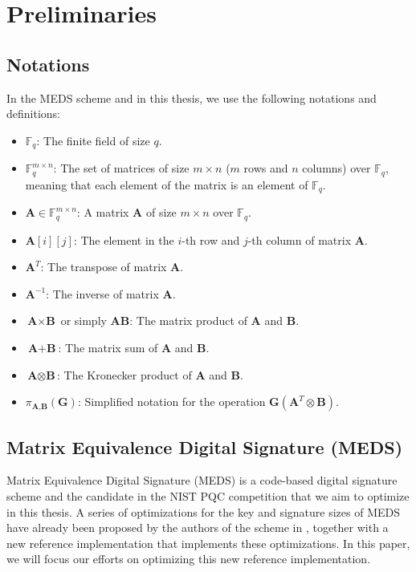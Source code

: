 \documentclass[11pt,a4paper]{report}
\theoremstyle{definition}
\begin{document}
\chapter{Preliminaries}
\label{ch:preliminaries}

\section{Notations}
\label{sec:notations}
In the MEDS scheme and in this thesis, we use the following notations and definitions:
\begin{itemize}
  \item $\mathbb{F}_q$: The finite field of size $q$.
  \item $\mathbb{F}_q^{m \times n}$: The set of matrices of size $m \times n$ ($m$ rows and $n$ columns) over $\mathbb{F}_q$, meaning that each element of the matrix is an element of $\mathbb{F}_q$.
  \item $\textbf{A} \in \mathbb{F}_q^{m \times n}$: A matrix $\textbf{A}$ of size $m \times n$ over $\mathbb{F}_q$.
  \item $\textbf{A}[i][j]$: The element in the $i$-th row and $j$-th column of matrix $\textbf{A}$.
  \item $\textbf{A}^T$: The transpose of matrix $\textbf{A}$.
  \item $\textbf{A}^{-1}$: The inverse of matrix $\textbf{A}$.
  \item $\textbf{A} \times \textbf{B}$ or simply $\textbf{AB}$: The matrix product of $\textbf{A}$ and $\textbf{B}$.
  \item $\textbf{A} + \textbf{B}$: The matrix sum of $\textbf{A}$ and $\textbf{B}$.
  \item $\textbf{A} \otimes \textbf{B}$: The Kronecker product of $\textbf{A}$ and $\textbf{B}$.
  \item $\pi_{\textbf{A}, \textbf{B}}(\textbf{G})$: Simplified notation for the operation $\textbf{G}(\textbf{A}^T \otimes \textbf{B})$.
\end{itemize}

\section{Matrix Equivalence Digital Signature (MEDS)}
\label{sec:meds}
Matrix Equivalence Digital Signature (MEDS) \cite{chou2023take} is a code-based digital signature scheme and the candidate in the NIST PQC competition that we aim to optimize in this thesis. A series of optimizations for the key and signature sizes of MEDS have already been proposed by the authors of the scheme in \cite{chou2024reducing}, together with a new reference implementation that implements these optimizations. In this paper, we will focus our efforts on optimizing this new reference implementation.
\end{document}
